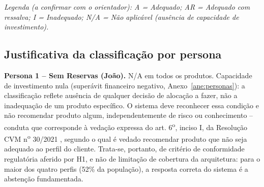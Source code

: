 \begin{quadro}[htbp]
  \centering
  \caption{Matriz de Adequa\c{c}\~ao Produto \texorpdfstring{$\times$}{x} Perfil}
  \label{qua:matriz-suitability}
\end{quadro}

\textit{Legenda (a confirmar com o orientador): A = Adequado; AR =
Adequado com ressalva; I = Inadequado; N/A = N\~ao aplic\'avel
(aus\^encia de capacidade de investimento).}

\subsection{Justificativa da classifica\c{c}\~ao por persona}
\label{sec:justificativa-matriz}

\textbf{Persona 1 -- Sem Reservas (Jo\~ao).} N/A em todos os produtos.
Capacidade de investimento nula (super\'avit financeiro negativo,
Anexo~\ref{ane:personas}): a classifica\c{c}\~ao reflete aus\^encia de
qualquer decis\~ao de aloca\c{c}\~ao a fazer, n\~ao a inadequa\c{c}\~ao
de um produto espec\'ifico. O sistema deve reconhecer essa
condi\c{c}\~ao e n\~ao recomendar produto algum, independentemente de
risco ou conhecimento -- conduta que corresponde \`a veda\c{c}\~ao
expressa do art. 6\textsuperscript{o}, inciso I, da Resolu\c{c}\~ao CVM
n\textsuperscript{o} 30/2021 \autocite{resolucaocvm30}, segundo o qual
\'e vedado recomendar produto que n\~ao seja adequado ao perfil do
cliente. Trata-se, portanto, de crit\'erio de conformidade regulat\'oria
aferido por H1, e n\~ao de limita\c{c}\~ao de cobertura da arquitetura:
para o maior dos quatro perfis (52\% da popula\c{c}\~ao), a resposta
correta do sistema \'e a absten\c{c}\~ao fundamentada.

